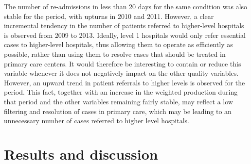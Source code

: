 \documentclass[11pt,a4paper,oneside]{article}
\begin{document}


The number of re-admissions in less than 20 days for the same condition was also stable for the period, with upturns in 2010 and 2011. However, a clear incremental tendency in the number of patients referred to higher-level hospitals is observed from 2009 to 2013. Ideally, level 1 hospitals would only refer essential cases to higher-level hospitals, thus allowing them to operate as efficiently as possible, rather than using them to resolve cases that should be treated in primary care centers. It would therefore be interesting to contain or reduce this variable whenever it does not negatively impact on the other quality variables. However, an upward trend in patient referrals to higher levels is observed for the period. This fact, together with an increase in the weighted production during that period and the other variables remaining fairly stable, may reflect a low filtering and resolution of cases in primary care, which may be leading to an unnecessary number of cases referred to higher level hospitals.





% 





\section{Results and discussion}
\label{sec:results_discussion}
\end{document}
